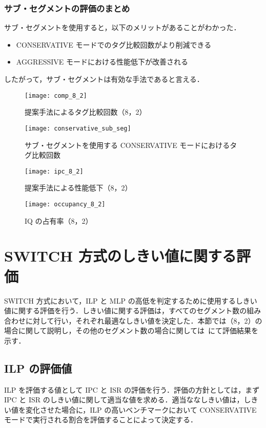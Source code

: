 \subsubsection{サブ・セグメントの評価のまとめ}
サブ・セグメントを使用すると，以下のメリットがあることがわかった．
\begin{itemize}
  \item CONSERVATIVE モードでのタグ比較回数がより削減できる
  \item AGGRESSIVE モードにおける性能低下が改善される
\end{itemize}
したがって，サブ・セグメントは有効な手法であると言える．

\begin{figure}[htb]
  \centering
  \texttt{[image: comp\_8\_2]}
  \caption{提案手法によるタグ比較回数（8，2）}
  \label{fig:comp_8_2}
\end{figure}

\begin{figure}[htb]
  \centering
  \texttt{[image: conservative\_sub\_seg]}
  \caption{サブ・セグメントを使用する CONSERVATIVE モードにおけるタグ比較回数}
  \label{fig:conservative_sub_seg}
\end{figure}

\begin{figure}[htb]
  \centering
  \texttt{[image: ipc\_8\_2]}
  \caption{提案手法による性能低下（8，2）}
  \label{fig:ipc_8_2}
\end{figure}

\begin{figure}[htb]
  \centering
  \texttt{[image: occupancy\_8\_2]}
  \caption{IQ の占有率（8，2）}
  \label{fig:occupancy_8_2}
\end{figure}

\clearpage

\section{SWITCH 方式のしきい値に関する評価}
\label{sec:eval_threshold}
SWITCH 方式において，ILP と MLP の高低を判定するために使用するしきい値に関する評価を行う．しきい値に関する評価は，すべてのセグメント数の組み合わせに対して行い，それぞれ最適なしきい値を決定した．本節では（8，2）の場合に関して説明し，その他のセグメント数の場合に関しては~にて評価結果を示す．

\subsection{ILP の評価値}
ILP を評価する値として IPC と ISR の評価を行う．評価の方針としては，まず IPC と ISR のしきい値に関して適当な値を求める．適当ななしきい値は，しきい値を変化させた場合に，ILP の高いベンチマークにおいて CONSERVATIVE モードで実行される割合を評価することによって決定する．

